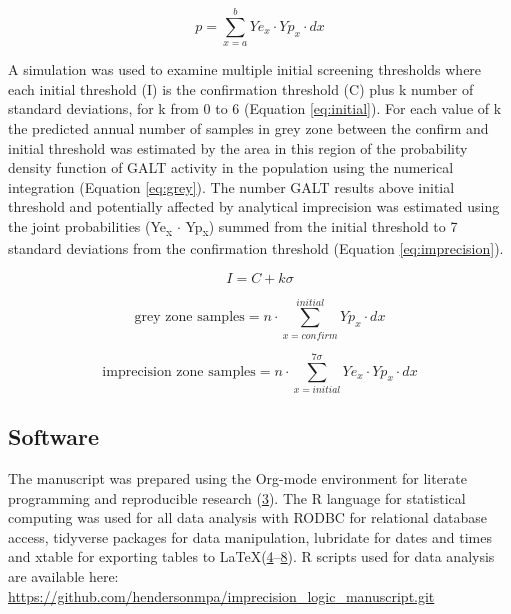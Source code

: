 \documentclass[review]{elsarticle}
\begin{document}
\begin{equation}\label{eq:joint}
p = \sum_{x=a}^b Ye_x \cdot Yp_x \cdot dx
\end{equation}

A simulation was used to examine multiple initial screening thresholds
where each initial threshold (I) is the confirmation threshold (C)
plus k number of standard deviations, for k from 0 to 6 (Equation
\ref{eq:initial}). For each value of k the predicted annual number of
samples in grey zone between the confirm and initial threshold was
estimated by the area in this region of the probability density
function of GALT activity in the population using the numerical
integration (Equation \ref{eq:grey}). The number GALT results above
initial threshold and potentially affected by analytical imprecision
was estimated using the joint probabilities (Ye\textsubscript{x} \(\cdot\) Yp\textsubscript{x}) summed from
the initial threshold to 7 standard deviations from the confirmation
threshold (Equation \ref{eq:imprecision}).

\begin{equation}\label{eq:initial}
I = C + k\sigma 
\end{equation}

\begin{equation}\label{eq:grey}
\text{grey zone samples}  =  n \cdot \sum_{x=confirm}^{initial} Yp_x \cdot dx
\end{equation}

\begin{equation}\label{eq:imprecision}
\text{imprecision zone samples}  =  n \cdot \sum_{x=initial}^{7\sigma} Ye_x \cdot Yp_x \cdot dx
\end{equation}

\subsection*{Software}
\label{sec:org714c9ed}
The manuscript was prepared using the Org-mode environment for
literate programming and reproducible research (\hyperlink{citeproc_bib_item_3}{3}). The R language for statistical computing was used
for all data analysis with RODBC for relational database access,
tidyverse packages for data manipulation, lubridate for dates and
times and xtable for exporting tables to
\LaTeX (\hyperlink{citeproc_bib_item_4}{4}–\hyperlink{citeproc_bib_item_8}{8}). R scripts
used for data analysis are available here:
\url{https://github.com/hendersonmpa/imprecision\_logic\_manuscript.git}
\end{document}
